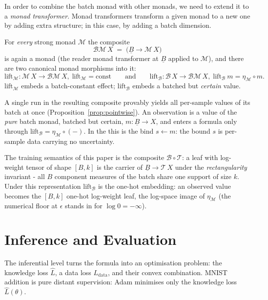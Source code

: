 \documentclass[anon]{../../journal-templates/NeSy26/nesy2026} %
\begin{document}
In order to combine the batch monad with other monads, we need to extend it to a \emph{monad transformer}. Monad transformers transform a given monad to a new one by adding extra structure; in this case, by adding a batch dimension.
\begin{proposition}
For \emph{every} strong monad $\mathcal M$ the composite
\[
  \mathcal B \mathcal M\,X \;=\; \bigl(\underline B \to \mathcal M\,X\bigr)
\]
is again a monad (the reader monad transformer at $\underline B$ applied to $\mathcal M$), and there are two
canonical monad morphisms into it:
\[
  \mathrm{lift}_{\mathcal M} \colon \mathcal M\,X \to \mathcal B\mathcal M\,X,\;
  \mathrm{lift}_{\mathcal M} = \mathrm{const}
  \qquad\text{and}\qquad
  \mathrm{lift}_{\mathcal B} \colon \mathcal B\,X \to \mathcal B\mathcal M\,X,\;
  \mathrm{lift}_{\mathcal B}\ m = \eta_{\mathcal M} \circ m.
\]
$\mathrm{lift}_{\mathcal M}$ embeds a batch-constant effect;
$\mathrm{lift}_{\mathcal B}$ embeds a batched but \emph{certain} value.
\end{proposition}

A single run in the resulting composite provably yields all per-sample
values of its batch at once (Proposition~\ref{prop:pointwise}).
An observation is a value of the \emph{pure} batch monad, batched but certain,
$m \colon \underline B \to X$, and enters a formula only through
$\mathrm{lift}_{\mathcal B} = \eta_{\mathcal M} \circ (-)$. In the \doNotation this is the
bind $s \leftarrow m$: the bound $s$ is per-sample data carrying no uncertainty.

The training semantics of this paper is the composite $\mathcal B \circ \mathcal{T}$: a
leaf with log-weight tensor of shape $[B, k]$ is the carrier of $\underline B \to \mathcal{T}\,X$
under the \emph{rectangularity} invariant - all $B$ component measures of the batch share one support of
size $k$.
Under this representation $\mathrm{lift}_{\mathcal B}$ is the one-hot embedding: an observed
value becomes the $[B,k]$ one-hot log-weight leaf, the log-space image of $\eta_{\mathcal M}$
(the numerical floor at $\epsilon$ stands in for $\log 0 = -\infty$).

\section{Inference and Evaluation}
\label{sec:eval}

The inferential level turns the formula into an optimisation problem: the knowledge loss
$\widehat L$, a data loss $L_{\mathrm{data}}$, and their convex
combination. MNIST addition is
pure distant supervision: Adam minimises only the knowledge loss
$\widehat L(\theta)$.
\end{document}
